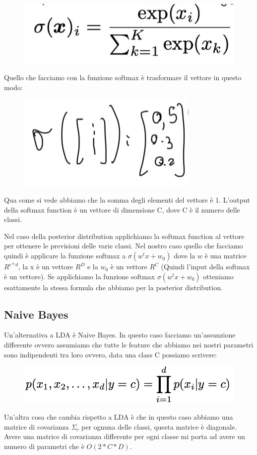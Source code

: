 \documentclass[14pt]{extreport}
\begin{document}
\begin{figure}[H]
\centering
\includegraphics[width=0.4\linewidth]{181.jpeg}
\end{figure}

Quello che facciamo con la funzione softmax è trasformare il vettore in questo modo:
\begin{figure}[H]
\centering
\includegraphics[width=0.3\linewidth]{182.jpeg}
\end{figure}
Qua come si vede abbiamo che la somma degli elementi del vettore è 1. L'output della softmax function è un vettore di dimensione C, dove C è il numero
delle classi.

Nel caso della posterior distribution applichiamo la softmax function al vettore per ottenere le previsioni delle varie classi. Nel nostro caso quello
che facciamo quindi è applicare la funzione softmax a $\sigma(w^tx+w_0)$ dove la $w$ è una matrice $R^{c*d}$, la x è un vettore $R^D$ e la $w_0$ è un
vettore $R^C$ (Quindi l'input della softmax è un vettore). Se applichiamo la funzione softmax $\sigma(w^tx+w_0)$ otteniamo esattamente la stessa
formula che abbiamo per la posterior distribution.


\subsection{Naive Bayes}

Un'alternativa a LDA è Naive Bayes. In questo caso facciamo un'assunzione differente ovvero assumiamo che tutte le feature che abbiamo nei nostri
parametri sono indipendenti tra loro ovvero, data una class C possiamo scrivere:

\begin{figure}[H]
\centering
\includegraphics[width=0.5\linewidth]{183.jpeg}
\end{figure}

Un'altra cosa che cambia rispetto a LDA è che in questo caso abbiamo una matrice di covarianza $\Sigma_c$ per ognuna delle classi, questa matrice è
diagonale. Avere una matrice di covarianza differente per ogni classe mi porta ad avere un numero di parametri che è $O(2*C*D)$.
\end{document}
